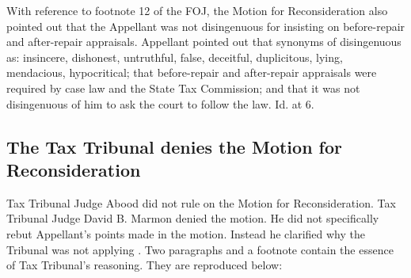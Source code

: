 \documentclass[12pt,\documentclassflag]{michiganCourtOfAppealsBrief}
\begin{document}
With reference to footnote 12 of the FOJ, the Motion for Reconsideration also pointed out that the Appellant was not disingenuous for insisting on before-repair and after-repair appraisals. Appellant pointed out that synonyms of disingenuous as: insincere, dishonest, untruthful, false, deceitful, duplicitous, lying, mendacious, hypocritical; that before-repair and after-repair appraisals were required by case law and the State Tax Commission; and that it was not disingenuous of him to ask the court to follow the law. Id. at 6.

\subsection{The Tax Tribunal denies the Motion for Reconsideration}

Tax Tribunal Judge Abood did not rule on the Motion for Reconsideration. Tax Tribunal Judge David B. Marmon denied the motion. He did not specifically rebut Appellant's points made in the motion. Instead he clarified why the Tribunal was not applying \mathieuGast. Two paragraphs and a footnote contain the essence of Tax Tribunal's reasoning. They are reproduced below:
\end{document}
